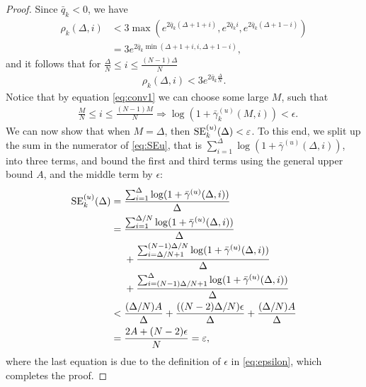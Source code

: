 \documentclass[conference, a4paper, 10pt]{IEEEtran}
\begin{document}
\begin{proof}
Since $\bar{q}_k < 0$, we have
\begin{align*}
\rho_k(\Delta, i) &< 3 \max(e^{2\bar{q}_k  (\Delta+1+i)},e^{2\bar{q}_k  i},e^{2\bar{q}_k  (\Delta+1-i)})
\\&= 3 e^{2\bar{q}_k  \min(\Delta+1+i,i,\Delta+1-i)},
\end{align*}
and it follows that for $\frac \Delta N \leq i \leq \frac{(N-1)\Delta}{N}$
\begin{align}
\rho_k(\Delta, i) < 3e^{2\bar{q}_k \frac \Delta N}.
\end{align}
Notice that by equation \eqref{eq:conv1} we can choose some large $M$,
such that
\begin{align}
&\frac M N \leq i \leq \frac{(N-1)M}{N}
    \Rightarrow
     \log(1 + \bar{\gamma}_k^{(u)}(M, i)) < \epsilon.
\end{align}
We can now show that when $M=\Delta$, then
$\textup{SE}_k^{(u)}(\Delta) < \varepsilon$.
To this end,
we split up the sum in the numerator of \eqref{eq:SEu}, that is
$\sum_{i=1}^{\Delta} \log(1 + \bar{\gamma}^{(u)}(\Delta ,i))$, into three terms,
and bound the first and third terms using the general upper bound $A$,
and the middle term by $\epsilon$:
\begin{align}
\nonumber
\textup{SE}_k^{(u)}(\Delta) &= \frac{\sum_{i=1}^{\Delta} \log(1 + \bar{\gamma}^{(u)}(\Delta ,i))}{\Delta}  \\ \nonumber
&=
\frac{\sum_{i=1}^{\Delta / N} \log(1 + \bar{\gamma}^{(u)}(\Delta ,i))}{\Delta} \\ \nonumber
&~~~~+
\frac{\sum_{i=\Delta / N + 1}^{(N - 1)\Delta / N} \log(1 + \bar{\gamma}^{(u)}(\Delta ,i))}{\Delta}
\\ \nonumber
&~~~~+
\frac{\sum_{i=(N-1)\Delta / N + 1}^{\Delta} \log(1 + \bar{\gamma}^{(u)}(\Delta ,i))}{\Delta}
\\ \nonumber
&<
\frac{(\Delta / N)A}{\Delta} + \frac{((N-2)\Delta / N)\epsilon}{\Delta} +
\frac{(\Delta / N)A}{\Delta}  \\ &=
\frac{2A + (N-2)\epsilon}{N} = \varepsilon,
\end{align}
where the last equation is due to the definition of $\epsilon$ in \eqref{eq:epsilon}, which completes the proof.
\end{proof}

\end{document}
